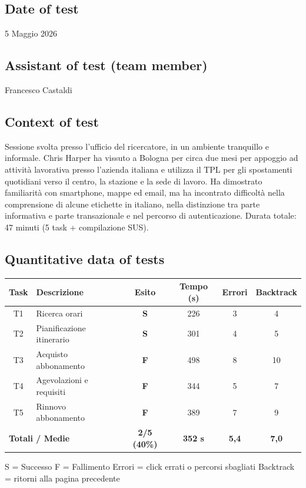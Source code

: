 ﻿\documentclass[11pt,a4paper]{article}
\begin{document}
\subsection*{Date of test}
\begin{tcolorbox}[base]
5 Maggio 2026
\end{tcolorbox}

\subsection*{Assistant of test (team member)}
\begin{tcolorbox}[base]
Francesco Castaldi
\end{tcolorbox}

\subsection*{Context of test}
\begin{tcolorbox}[base]
Sessione svolta presso l'ufficio del ricercatore, in un ambiente tranquillo e informale. Chris Harper ha vissuto a Bologna per circa due mesi per appoggio ad attività lavorativa presso l'azienda italiana e utilizza il TPL per gli spostamenti quotidiani verso il centro, la stazione e la sede di lavoro. Ha dimostrato familiarità con smartphone, mappe ed email, ma ha incontrato difficoltà nella comprensione di alcune etichette in italiano, nella distinzione tra parte informativa e parte transazionale e nel percorso di autenticazione. Durata totale: 47 minuti (5 task + compilazione SUS).
\end{tcolorbox}

\subsection*{Quantitative data of tests}
\begin{tcolorbox}[base]
\begin{center}
\renewcommand{\arraystretch}{1.4}
\begin{tabular}{clcccc}
\toprule
\textbf{Task} & \textbf{Descrizione} &
\textbf{Esito} & \textbf{Tempo (s)} &
\textbf{Errori} & \textbf{Backtrack} \\
\midrule
T1 & Ricerca orari             & \textbf{S} & 226 & 3 & 4 \\
T2 & Pianificazione itinerario & \textbf{S} & 301 & 4 & 5 \\
T3 & Acquisto abbonamento      & \textbf{F} & 498 & 8 & 10 \\
T4 & Agevolazioni e requisiti   & \textbf{F} & 344 & 5 & 7 \\
T5 & Rinnovo abbonamento       & \textbf{F} & 389 & 7 & 9 \\
\midrule
\multicolumn{2}{l}{\textbf{Totali / Medie}} &
\textbf{2/5 (40\%)} & \textbf{352 s} &
\textbf{5,4} & \textbf{7,0} \\
\bottomrule
\end{tabular}
\end{center}
\vspace{0.3cm}
\small S = Successo \quad F = Fallimento \quad
Errori = click errati o percorsi sbagliati \quad
Backtrack = ritorni alla pagina precedente
\end{tcolorbox}
\end{document}
